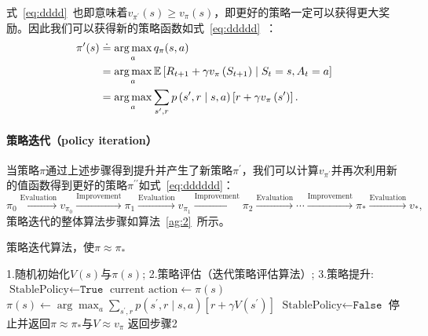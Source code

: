 式~\eqref{eq:dddd}~也即意味着$v_{\pi^{\prime}}(s) \geq v_{\pi}(s)$，即更好的策略一定可以获得更大奖励。因此我们可以获得新的策略函数如式~\eqref{eq:ddddd}~：
\begin{equation}
  \begin{aligned}
  \pi^{\prime}(s) & \doteq \operatorname*{\arg\max}_a q_{\pi}(s, a) \\
  &=\operatorname*{\arg\max}_a \mathbb{E}\left[R_{t+1}+\gamma v_{\pi}\left(S_{t+1}\right) \mid S_{t}=s, A_{t}=a\right] \\
  &=\operatorname*{\arg\max}_a \sum_{s^{\prime}, r} p\left(s^{\prime}, r \mid s, a\right)\left[r+\gamma v_{\pi}\left(s^{\prime}\right)\right].
  \end{aligned}
  \label{eq:ddddd}
\end{equation}

\paragraph{策略迭代（policy iteration）}
当策略$\pi$通过上述步骤得到提升并产生了新策略$\pi^{\prime}$，我们可以计算$v_{\pi^{\prime}}$并再次利用新的值函数得到更好的策略$\pi^{\prime\prime}$如式~\eqref{eq:dddddd}：
\begin{equation}
  \pi_{0} \stackrel{\mathrm{Evaluation}}{\longrightarrow} v_{\pi_{0}} \stackrel{\mathrm{Improvement}}{\longrightarrow} \pi_{1} \stackrel{\mathrm{Evaluation}}{\longrightarrow} v_{\pi_{1}} \stackrel{\mathrm{Improvement}}{\longrightarrow} \pi_{2} \stackrel{\mathrm{Evaluation}}{\longrightarrow} \cdots \stackrel{\mathrm{Improvement}}{\longrightarrow} \pi_{*} \stackrel{\mathrm{Evaluation}}{\longrightarrow} v_{*},
  \label{eq:dddddd}
\end{equation}
策略迭代的整体算法步骤如算法~\ref{ag:2}~所示。
\begin{algorithm}[!t]
  \caption{策略迭代算法，使$\pi \approx \pi_{*} $}
  \begin{algorithmic}
    \State 1.随机初始化$V(s)$与$\pi(s)$;
    \State 2.策略评估（迭代策略评估算法）;
    \State 3.策略提升:
    \State $\text{StablePolicy} \leftarrow \texttt{True}$
    \State $\text{current action}\leftarrow\pi(s)$
    \State $\pi(s) \leftarrow \arg \max _{a} \sum_{s^{\prime}, r} p\left(s^{\prime}, r \mid s, a\right)\left[r+\gamma V\left(s^{\prime}\right)\right]$
        \State $\text{StablePolicy} \leftarrow \texttt{False}$
    \EndIf
    \EndFor
    \State 停止并返回$\pi \approx \pi_{*} $与$V\approx v_{\pi} $
    \Else 
    \State 返回步骤2
    \EndIf
  \end{algorithmic}
  \label{ag:2}
\end{algorithm}
